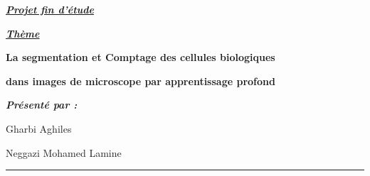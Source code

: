 \documentclass[12pt]{report}
\newenvironment{changemargin}[2]{%
\begin{list}{}{%
\setlength{\topsep}{0pt}%
\setlength{\leftmargin}{#1}%
\setlength{\rightmargin}{#2}%
\setlength{\listparindent}{\parindent}%
\setlength{\itemindent}{\parindent}%
\setlength{\parsep}{\parskip}%
}%
\item[]}{\end{list}}
\begin{document}
\begin{titlepage}
    \begin{center}
        \begin{large}

            \vspace{0.1in}

            \textit{\textbf{\uline{Projet fin d'étude}}}
        
        \end{large}

        \vspace{0.3in}

        \textit{\Huge{\textbf{\uline{Thème}}}}

        \vspace{0.2in}

        \begin{mdframed}[style=MyFrame]
            \begin{center}
            \color{Black}
              \Large{\textbf{La segmentation et Comptage des cellules biologiques}}

              \Large{\textbf{dans images de microscope par apprentissage profond}}
            \end{center}
        \end{mdframed}
    \end{center}

    \vspace{0.4in}

    \hspace{0.2in}
    \textit{\textbf{Présenté par :}}

    \hspace{0.2in}
    Gharbi Aghiles

    \hspace{0.2in}
    Neggazi Mohamed Lamine

\end{titlepage}

\newpage

\vspace*{0.2in}

\thispagestyle{empty}

\begin{center}
    {\color{Black} \rule{3in}{1.4mm} }\\
    \vspace{0.1in}
    \scshape{\fontsize{34}{46}{\bfseries{\color{Black}{Résumé}}}}
    \\
    \vspace{0.6in}
\end{center}
\begin{changemargin}{0.9cm}{0.9cm}
\hspace*{0.16in}
\end{changemargin}
\end{document}
